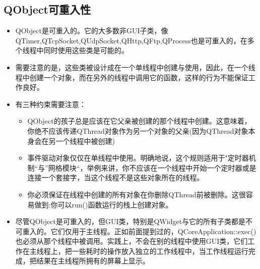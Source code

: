 \documentclass[9pt,b5paper]{article}
\begin{document}
\subsection{QObject可重入性}
\label{sec-2-1}
\begin{itemize}
\item QObject是可重入的。它的大多数非GUI子类，像QTimer,QTcpSocket,QUdpSocket,QHttp,QFtp,QProcess也是可重入的，在多个线程中同时使用这些类是可能的。
\item 需要注意的是，这些类被设计成在一个单线程中创建与使用，因此，在一个线程中创建一个对象，而在另外的线程中调用它的函数，这样的行为不能保证工作良好。
\item 有三种约束需要注意：
\begin{itemize}
\item QObject的孩子总是应该在它父亲被创建的那个线程中创建。这意味着，你绝不应该传递QThread对象作为另一个对象的父亲(因为QThread对象本身会在另一个线程中被创建)
\item 事件驱动对象仅仅在单线程中使用。明确地说，这个规则适用于"定时器机制“与”网格模块“，举例来讲，你不应该在一个线程中开始一个定时器或是连接一个套接字，当这个线程不是这些对象所在的线程。
\item 你必须保证在线程中创建的所有对象在你删除QThread前被删除。这很容易做到:你可以run()函数运行的栈上创建对象。
\end{itemize}
\item 尽管QObject是可重入的，但GUI类，特别是QWidget与它的所有子类都是不可重入的。它们仅用于主线程。正如前面提到过的，QCoreApplication::exec()也必须从那个线程中被调用。实践上，不会在别的线程中使用GUI类，它们工作在主线程上，把一些耗时的操作放入独立的工作线程中，当工作线程运行完成，把结果在主线程所拥有的屏幕上显示。
\end{itemize}
\end{document}
